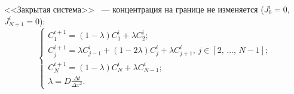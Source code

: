 







<<Закрытая система>> ~--- концентрация на границе не изменяется ($J_{0}^{i} = 0$, $J_{N+1}^{i} = 0$):
\begin{equation}
	\begin{cases}
		C^{i+1}_{1} = (1 - \lambda)C^{i}_{1} + \lambda C^{i}_{2};\\
		C^{i+1}_{j} = \lambda C^{i}_{j-1} + (1 - 2\lambda)C^{i}_{j} + \lambda C^{i}_{j+1},\,j \in [2,\,\dots,\,N-1];\\
		C^{i+1}_{N} = (1 - \lambda)C^{i}_{N} + \lambda C^{i}_{N-1};\\
		\lambda = D\frac{\Delta t}{\Delta x^{2}}.
	\end{cases}
\end{equation}

